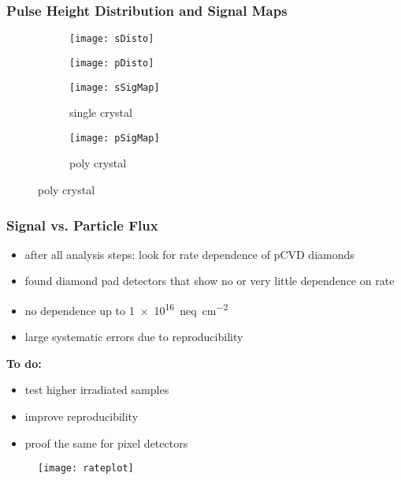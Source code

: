\begin{frame}
	\frametitle{Pulse Height Distribution and Signal Maps}
	\vspace*{-7.5pt}
	\def \sp {0.65\textwidth}
	\begin{figure}
		\centering
		\begin{subfigure}{0.45\textwidth} 
			\centering 
			\texttt{[image: sDisto]}
		\end{subfigure}
		\begin{subfigure}{0.45\textwidth} 
			\centering 
			\texttt{[image: pDisto]}
		\end{subfigure}
	\end{figure}
	\vspace*{-15pt}
	\begin{figure}
	\centering
		\begin{subfigure}{0.45\textwidth} 
			\centering 
			\texttt{[image: sSigMap]}
			\caption{single crystal}
		\end{subfigure}
		\begin{subfigure}{0.45\textwidth} 
			\centering 
			\texttt{[image: pSigMap]}
			\caption{poly crystal}
		\end{subfigure} 
	\end{figure}
\end{frame}
\begin{frame}
	\frametitle{Signal vs. Particle Flux}
	\begin{minipage}[c][.75\textheight]{.5\textwidth}
		\begin{itemize}
			\setlength{\itemsep}{\fill}
			\item after all analysis steps: look for rate dependence of pCVD diamonds
			\item found diamond pad detectors that show no or very little dependence on rate
			\item no dependence up to \SI{1e16}{neq\per cm^2}
			\item large systematic errors due to reproducibility
		\end{itemize}
		\vspace*{3pt}
		\textbf{To do:}
		\begin{itemize}
			\setlength{\itemsep}{\fill}
			\item test higher irradiated samples
			\item improve reproducibility
			\item proof the same for pixel detectors
		\end{itemize}
	\end{minipage}
	\hspace*{5pt}
	\begin{minipage}{.45\textwidth}
		\begin{figure}
			\centering
			\texttt{[image: rateplot]}
		\end{figure}
	\end{minipage}
\end{frame}
